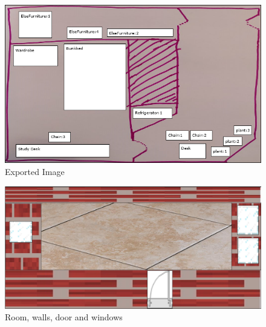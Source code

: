\begin{figure}[h]
	\includegraphics[keepaspectratio,width=\textwidth]{images/output.png}
	\caption{Exported Image}
\end{figure}

\begin{figure}[h]
	\includegraphics[keepaspectratio,width=\textwidth]{images/result.png}
	\caption{Room, walls, door and windows}
\end{figure}
